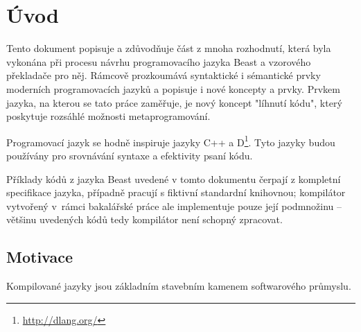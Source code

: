 
\newcommand{\ctime}{\inlineCode{@ctime}\xspace}
\newcommand{\nonctime}{ne-\inlineCode{@ctime}\xspace}

\chapter{Úvod}
Tento dokument popisuje a zdůvodňuje část z mnoha rozhodnutí, která byla vykonána při procesu návrhu programovacího jazyka Beast a vzorového překladače pro něj. Rámcově prozkoumává syntaktické i sémantické prvky moderních programovacích jazyků a popisuje i nové koncepty a prvky. Prvkem jazyka, na kterou se tato práce zaměřuje, je nový koncept "líhnutí kódu", který poskytuje rozsáhlé možnosti metaprogramování.

Programovací jazyk se hodně inspiruje jazyky C++ a D\footnote{\url{http://dlang.org/}}. Tyto jazyky budou používány pro srovnávání syntaxe a efektivity psaní kódu.

Příklady kódů z jazyka Beast uvedené v tomto dokumentu čerpají z kompletní specifikace jazyka, případně pracují s fiktivní standardní knihovnou; kompilátor vytvořený v~rámci bakalářské práce ale implementuje pouze její podmnožinu -- většinu uvedených kódů tedy kompilátor není schopný zpracovat.

\section{Motivace}
Kompilované jazyky jsou základním stavebním kamenem softwarového průmyslu. 

